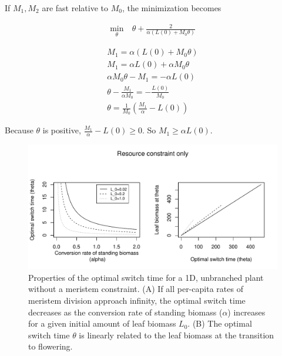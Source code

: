 \documentclass[12pt, oneside]{article}   	%
\begin{document}
If $M_1, M_2$ are fast relative to $M_0$, the minimization becomes

\begin{align}
\min_{\theta} & \ \theta + \frac{2}{\alpha(L(0) + M_0 \theta)}  \nonumber
\end{align}

\begin{align}
M_1= \alpha (L(0) + M_0 \theta ) \nonumber \\
M_1 = \alpha L(0) + \alpha M_0 \theta  \nonumber \\
\alpha M_0 \theta - M_1   = - \alpha L(0)  \nonumber \\
\theta - \frac{M_1}{\alpha M_0} = - \frac{L(0)}{M_0} \nonumber \\
\theta  =  \frac{1}{M_0} (\frac{M_1}{\alpha} - L(0)) \nonumber 
\end{align}

Because $\theta$ is positive, $\frac{M_1}{\alpha} - L(0)\geq0$. So $M_1 \geq \alpha L(0)$.


\begin{figure}[!h]
       \includegraphics[width=\textwidth]{../../figures/1d-resource-only.pdf}  
    \caption{ Properties of the optimal switch time for a 1D, unbranched plant without a meristem constraint. (A) If all per-capita rates of meristem division approach infinity, the optimal switch time decreases as the conversion rate of standing biomass ($\alpha$) increases  for a given initial amount of leaf biomass $L_0$. (B) The optimal switch time $\theta$ is linearly related to the leaf biomass at the transition to flowering.   }
 \label{fig:figure-x}
\end{figure}
\end{document}
